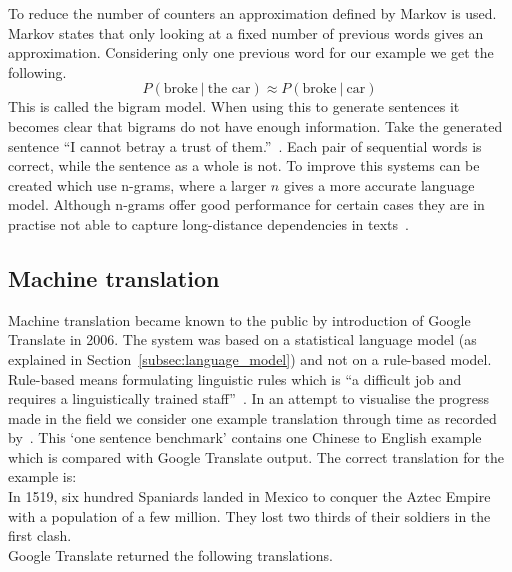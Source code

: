 To reduce the number of counters an approximation defined by Markov is used.
Markov states that only looking at a fixed number of previous words gives an approximation.
Considering only one previous word for our example we get the following.
\[ P(\text{broke} \: | \: \text{the car}) \approx P(\text{broke} \: | \: \text{car}) \]
This is called the bigram model.
When using this to generate sentences it becomes clear that bigrams do not have enough information.
Take the generated sentence ``I cannot betray a trust of them.''~\citep{langkilde1998practical}.
Each pair of sequential words is correct, while the sentence as a whole is not.
To improve this systems can be created which use n-grams, where a larger $n$ gives a more accurate language model.
Although n-grams offer good performance for certain cases they are in practise not able to capture long-distance dependencies in texts~\citep{manning2017lectures}.

\subsection{Machine translation}
\label{subsec:mt}
Machine translation became known to the public by introduction of Google Translate in 2006.
The system was based on a statistical language model (as explained in Section~\ref{subsec:language_model}) and not on a rule-based model.
Rule-based means formulating linguistic rules which is ``a difficult job and requires a linguistically trained staff''~\citep{sumita1991experiments}.
In an attempt to visualise the progress made in the field we consider one example translation through time as recorded by~\citet{manning2017lectures}.
This `one sentence benchmark' contains one Chinese to English example which is compared with Google Translate output.
The correct translation for the example is:\\

In 1519, six hundred Spaniards landed in Mexico to conquer the Aztec Empire with a population of a few million.
They lost two thirds of their soldiers in the first clash.\\

Google Translate returned the following translations.

